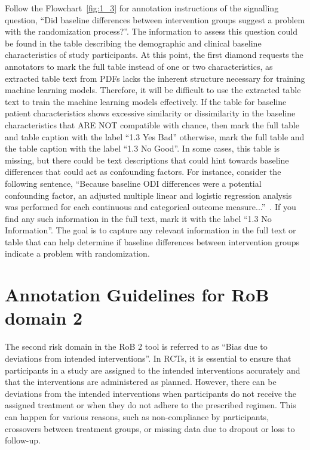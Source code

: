 \documentclass[sn-mathphys,Numbered]{sn-jnl}%
\begin{document}
%
%
%
Follow the Flowchart~\ref{fig:1_3} for annotation instructions of the signalling question, ``Did baseline differences between intervention groups suggest a problem with the randomization process?''.
The information to assess this question could be found in the table describing the demographic and clinical baseline characteristics of study participants. 
At this point, the first diamond requests the annotators to mark the full table instead of one or two characteristics, as extracted table text from PDFs lacks the inherent structure necessary for training machine learning models.
Therefore, it will be difficult to use the extracted table text to train the machine learning models effectively. 
If the table for baseline patient characteristics shows excessive similarity or dissimilarity in the baseline characteristics that ARE NOT compatible with chance, then mark the full table and table caption with the label ``1.3 Yes Bad'' otherwise, mark the full table and the table caption with the label ``1.3 No Good''.
In some cases, this table is missing, but there could be text descriptions that could hint towards baseline differences that could act as confounding factors.
For instance, consider the following sentence, ``Because baseline ODI differences were a potential confounding factor, an adjusted multiple linear and logistic regression analysis was performed for each continuous and categorical outcome measure...''~\citep{cohen2008randomized}.
If you find any such information in the full text, mark it with the label ``1.3 No Information''.
The goal is to capture any relevant information in the full text or table that can help determine if baseline differences between intervention groups indicate a problem with randomization.
%
%
%
\section*{Annotation Guidelines for RoB domain 2}
\label{sec:dom2}
%
The second risk domain in the RoB 2 tool is referred to as ``Bias due to deviations from intended interventions''.
In RCTs, it is essential to ensure that participants in a study are assigned to the intended interventions accurately and that the interventions are administered as planned.
However, there can be deviations from the intended interventions when participants do not receive the assigned treatment or when they do not adhere to the prescribed regimen.
This can happen for various reasons, such as non-compliance by participants, crossovers between treatment groups, or missing data due to dropout or loss to follow-up.
\end{document}
